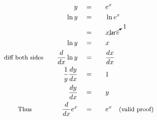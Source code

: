 \begin{alignat*}{5}
&\,&y\quad&=\quad&&e^x\\
&\,&\ln{y}\quad&=&&\ln{e^x}\\
&\,&\,&=&&x\cancelto{1}{\ln{e}}\\
&\,&\ln{y}\quad&=&&x\\
&\small\text{diff both sides}\normalsize\quad&\frac{d}{dx}\ln{y}\quad&=&&\frac{dx}{dx}\\
&\,&\frac{1}{y}\frac{dy}{dx}\quad&=&&1\\
&\,&\frac{dy}{dx}\quad&=&&y\\
&\qquad\small\text{Thus}\normalsize\quad&\frac{d}{dx}e^x\quad&=&&e^x\quad\small\text{(valid proof)}
\end{alignat*}
